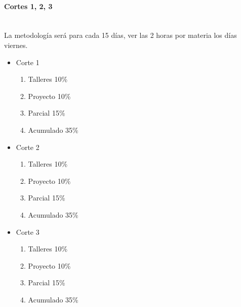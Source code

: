 \documentclass[a4paper]{report} %
\begin{document}
          \paragraph{Cortes 1, 2, 3}\mbox{}\\
          La metodología será para cada 15 días, ver las 2 horas por materia los días viernes.
            \begin{itemize}
              \item Corte 1
              \begin{enumerate}
                \item Talleres 10\%
                \item Proyecto 10\%
                \item Parcial 15\%
                \item Acumulado 35\%
              \end{enumerate}
              \item Corte 2
              \begin{enumerate}
                 \item Talleres 10\%
                \item Proyecto 10\%
                \item Parcial 15\%
                \item Acumulado 35\%
              \end{enumerate}
              \item Corte 3
              \begin{enumerate}
                \item Talleres 10\%
                \item Proyecto 10\%
                \item Parcial 15\%
                \item Acumulado 35\%
              \end{enumerate}
            \end{itemize}
\end{document}
